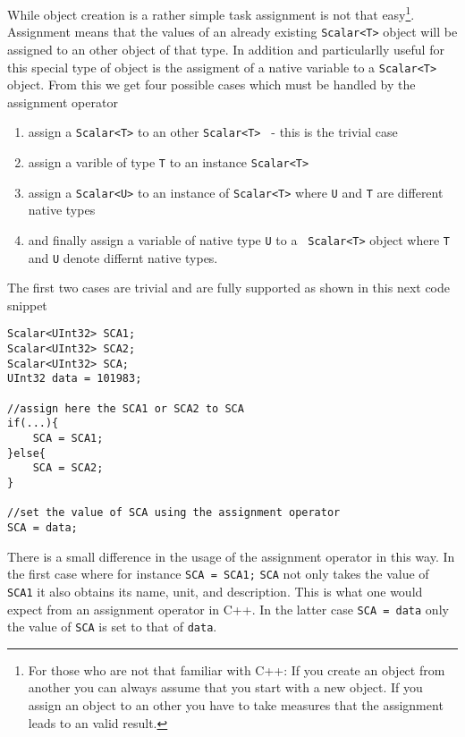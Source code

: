 While object creation is a rather simple task assignment is not that
easy\footnote{ For those who are not that familiar with C++: If you create an
object from another you can always assume that you start with a new object. 
If you assign an object to an other you have to take measures that the
assignment leads to an valid result.}.
Assignment means that the values of an already existing {\tt Scalar<T>} object 
will be assigned to an other object of that type. In addition and particularlly
useful for this special type of object is the assigment of a native variable 
to a {\tt Scalar<T>} object.
From this we get four possible cases which must be handled by the assignment
operator
\begin{enumerate}
  \item assign a {\tt Scalar<T>} to an other {\tt Scalar<T> } - this is the
  trivial case
  \item assign a varible of type {\tt T} to an instance {\tt Scalar<T>}
  \item assign a {\tt Scalar<U>} to an instance of {\tt Scalar<T>} where {\tt U}
  and {\tt T} are different native types
  \item and finally assign a variable of native type {\tt U} to a {\tt
  Scalar<T>} object where {\tt T} and {\tt U} denote differnt native types.
\end{enumerate}
The first two cases are trivial and are fully supported as shown in this 
next code snippet
\begin{verbatim}
Scalar<UInt32> SCA1;
Scalar<UInt32> SCA2;
Scalar<UInt32> SCA;
UInt32 data = 101983;

//assign here the SCA1 or SCA2 to SCA
if(...){ 
    SCA = SCA1;
}else{
    SCA = SCA2;
}

//set the value of SCA using the assignment operator
SCA = data;
\end{verbatim}
There is a small difference in the usage of the assignment operator in this 
way. In the first case where for instance {\tt SCA = SCA1;} {\tt SCA} not 
only takes the value of {\tt SCA1} it also obtains its name, unit, and 
description. This is what one would expect from an assignment operator 
in C++. In the latter case {\tt SCA = data} only the value of {\tt SCA} is set
to that of {\tt data}. 

